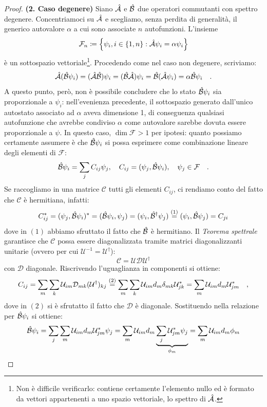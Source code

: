 \begin{proof}
    \textbf{(2. Caso degenere)} Siano $\h{A}$ e $\h{B}$ due operatori commutanti con spettro degenere. Concentriamoci su $\h{A}$ e scegliamo, senza perdita di generalità, il generico autovalore $\alpha$ a cui sono associate $n$ autofunzioni. L'insieme
    \[
        \mathcal{F}_n \coloneq \left\{ \psi_i, i \in \{1, n\} : \h{A}\psi_i = \alpha \psi_i  \right\}
    \]
    è un sottospazio vettoriale\footnote{Non è difficile verificarlo: contiene certamente l'elemento nullo ed è formato da vettori appartenenti a uno spazio vettoriale, lo spettro di $\h{A}$.}. Procedendo come nel caso non degenere, scriviamo:
    \[
        \h{A}(\h{B}\psi_i) = (\h{A}\h{B})\psi_i = (\h{B}\h{A})\psi_i = \h{B}(\h{A}\psi_i) = \alpha \h{B}\psi_i \quad.
    \]
    A questo punto, però, non è possibile concludere che lo stato $\h{B}\psi_i$ sia proporzionale a $\psi_i$: nell'evenienza precedente, il sottospazio generato dall'unico autostato associato ad $\alpha$ aveva dimensione 1, di conseguenza qualsiasi autofunzione che avrebbe condiviso $\alpha$ come autovalore sarebbe dovuta essere proporzionale a $\psi$. In questo caso, $\dim{\mathcal{F}} > 1$ per ipotesi: quanto possiamo certamente assumere è che $\h{B}\psi_i$ si possa esprimere come combinazione lineare degli elementi di $\mathcal{F}$:
    \[
        \h{B}\psi_i = \sum_j C_{ij}\psi_j,\quad C_{ij} = (\psi_j, \h{B}\psi_i), \quad \psi_j \in \mathcal{F} \quad.
    \]
    Se raccogliamo in una matrice $\mathcal{C}$ tutti gli elementi $C_{ij}$, ci rendiamo conto del fatto che $\mathcal{C}$ è hermitiana, infatti:
    \[
        C_{ij}^* = (\psi_j, \h{B}\psi_i)^* = (\h{B}\psi_i, \psi_j) =  (\psi_i, \hd{B}\psi_j) \giustifica[=]{1} (\psi_i, \h{B}\psi_j) = C_{ji}
    \]
    dove in $(1)$ abbiamo sfruttato il fatto che $\h{B}$ è hermitiano. Il \emph{Teorema spettrale} garantisce che $\mathcal{C}$ possa essere diagonalizzata tramite matrici diagonalizzanti unitarie (ovvero per cui $\mathcal{U}^{-1} =\mathcal{U}^{\dagger} $):
    \[  
        \mathcal{C} = \mathcal{U} \mathcal{D} \mathcal{U}^{\dagger}
    \]
    con $\mathcal{D}$ diagonale. Riscrivendo l'uguaglianza in componenti si ottiene:
    \[
        C_{ij} = \sum_m \sum_k \mathcal{U}_{im} \mathcal{D}_{mk} (\mathcal{U}^{\dagger})_{kj} \giustifica[=]{2} \sum_m \sum_k \mathcal{U}_{im} d_m \delta_{mk} \mathcal{U}^*_{jk} = \sum_m \mathcal{U}_{im} d_m \mathcal{U}^*_{jm} \quad,
    \] 
    dove in $(2)$ si è sfrutatto il fatto che $\mathcal{D}$ è diagonale. Sostituendo nella relazione per $\h{B}\psi_i$ si ottiene:
    \[
        \h{B}\psi_i = \sum_j\sum_m \mathcal{U}_{im} d_m \mathcal{U}^*_{jm} \psi_j = \sum_m \mathcal{U}_{im} d_m \underbrace{\sum_j \mathcal{U}^*_{jm} \psi_j}_{\phi_m} = \sum_m \mathcal{U}_{im} d_m \phi_m
\]
\end{proof}

